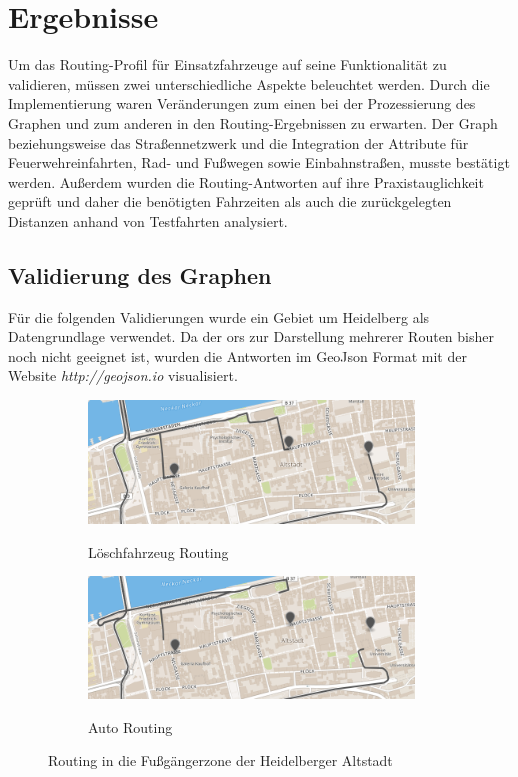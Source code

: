 \section{Ergebnisse}

Um das Routing-Profil für Einsatzfahrzeuge auf seine Funktionalität zu validieren, müssen zwei unterschiedliche Aspekte beleuchtet werden.
Durch die Implementierung waren Veränderungen zum einen bei der Prozessierung des Graphen und zum anderen in den Routing-Ergebnissen zu erwarten.
Der Graph beziehungsweise das Straßennetzwerk und die Integration der Attribute für Feuerwehreinfahrten, Rad- und Fußwegen sowie Einbahnstraßen, musste bestätigt werden.
Außerdem wurden die Routing-Antworten auf ihre Praxistauglichkeit geprüft und daher die benötigten Fahrzeiten als auch die zurückgelegten Distanzen anhand von Testfahrten analysiert.


\subsection{Validierung des Graphen}

Für die folgenden Validierungen wurde ein Gebiet um Heidelberg als Datengrundlage verwendet.
Da der \gls{ors} zur Darstellung mehrerer Routen bisher noch nicht geeignet ist, wurden die Antworten im GeoJson Format mit der Website \textit{http://geojson.io} visualisiert.

\begin{figure}[htb]
\centering
\begin{subfigure}{0.49\textwidth}
\centering
\includegraphics[width = 0.95\textwidth]{../media/Altstadt_emergency.png} \\
\caption{Löschfahrzeug Routing}
\label{fig:alteme}
\end{subfigure}
\begin{subfigure}{0.49\textwidth}
\centering
\includegraphics[width = 0.95\textwidth]{../media/Altstadt_car.png} \\
\caption{Auto Routing}
\label{fig:altcar}
\end{subfigure}
\caption{Routing in die Fußgängerzone der Heidelberger Altstadt}
\label{fig:footway}
\end{figure}

